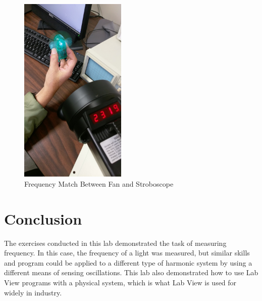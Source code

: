 \documentclass[12pt]{article}
\begin{document}
\begin{figure}[h!] %
   \centering
   \includegraphics[width=2in]{fan_frequency_match.jpg} 
   \caption{Frequency Match Between Fan and Stroboscope}
   \label{fig:example}
\end{figure}

\newpage

\section*{\fontsize{12}{12}\selectfont \large Conclusion}
The exercises conducted in this lab demonstrated the task of measuring frequency. In this case, the frequency of a light was measured, but similar skills and program could be applied to a different type of harmonic system by using a different means of sensing oscillations. This lab also demonstrated how to use Lab View programs with a physical system, which is what Lab View is used for widely in industry.




%
%




\end{document}
